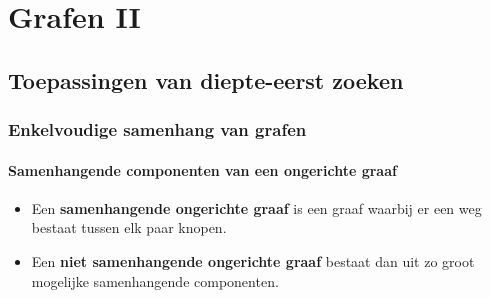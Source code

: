 \documentclass{report}
\begin{document}
\part{Grafen II}
\chapter{Toepassingen van diepte-eerst zoeken}
\section{Enkelvoudige samenhang van grafen}
\subsection{Samenhangende componenten van een ongerichte graaf}
\begin{itemize}
	\item[\info] Een \textbf{samenhangende ongerichte graaf} is een graaf waarbij er een weg bestaat tussen elk paar knopen.
	\item[\info] Een \textbf{niet samenhangende ongerichte graaf} bestaat dan uit zo groot mogelijke samenhangende componenten.
\end{itemize}
\end{document}
